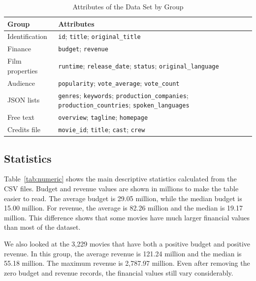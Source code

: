 \documentclass[conference]{IEEEtran}
\begin{document}
\begin{table}[t]
\caption{Attributes of the Data Set by Group}
\label{tab:attrs}
\centering
\scriptsize
\begin{tabular}{p{}p{}}
\toprule
Group & Attributes \\
\midrule
Identification & \texttt{id}; \texttt{title}; \texttt{original\_title} \\
Finance & \texttt{budget}; \texttt{revenue} \\
Film properties & \texttt{runtime}; \texttt{release\_date}; \texttt{status}; \texttt{original\_language} \\
Audience & \texttt{popularity}; \texttt{vote\_average}; \texttt{vote\_count} \\
JSON lists & \texttt{genres}; \texttt{keywords}; \texttt{production\_companies}; \texttt{production\_countries}; \texttt{spoken\_languages} \\
Free text & \texttt{overview}; \texttt{tagline}; \texttt{homepage} \\
Credits file & \texttt{movie\_id}; \texttt{title}; \texttt{cast}; \texttt{crew} \\
\bottomrule
\end{tabular}
\end{table}

\subsection{Statistics}
Table~\ref{tab:numeric} shows the main descriptive statistics calculated
from the CSV files. Budget and revenue values are shown in millions to
make the table easier to read. The average budget is 29.05 million,
while the median budget is 15.00 million. For revenue, the average is
82.26 million and the median is 19.17 million. This difference shows
that some movies have much larger financial values than most of the
dataset.

We also looked at the 3,229 movies that have both a positive budget
and positive revenue. In this group, the average revenue is 121.24
million and the median is 55.18 million. The maximum revenue is
2,787.97 million. Even after removing the zero budget and revenue
records, the financial values still vary considerably.
\end{document}
